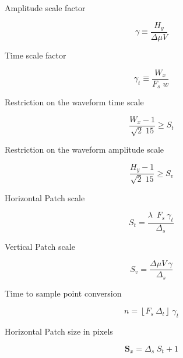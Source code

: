 Amplitude scale factor

\begin{equation}
\gamma \equiv \frac{H_y}{\Delta \mu V}  
\label{eq:gammadefinition}
\end{equation}

Time scale factor

\begin{equation}
\gamma_t \equiv \frac{W_x}{F_s \; w}  
\label{eq:gammatdefinition}
\end{equation}

%

Restriction on the waveform time scale

\begin{equation}
\frac{W_x-1}{\sqrt{2} \; 15}  \geq S_t 
\label{eq:restriction1}
\end{equation}

Restriction on the waveform amplitude scale

\begin{equation}
\frac{H_y-1}{\sqrt{2} \; 15}  \geq S_v 
\label{eq:restriction2}
\end{equation}

Horizontal Patch scale

\begin{equation}
S_t = \frac{ \lambda \;  \  F_s \ \gamma_t }{\Delta_s}
\label{eq:mapping2}
\end{equation}

Vertical Patch scale

\begin{equation}
S_v= \frac{\Delta \mu V \ \gamma}{\Delta_s} 
\label{eq:mapping1}
\end{equation}

Time to sample point conversion

\begin{equation}
n = \left\lfloor F_s \ \Delta_t \right\rfloor \ \gamma_t
\label{eq:mapping1}
\end{equation}

Horizontal Patch size in pixels

\begin{equation}
\mathbf{S}_x = \Delta_s \; S_t + 1
\label{eq:mapping2}
\end{equation}

